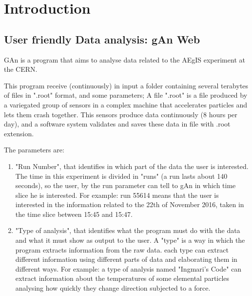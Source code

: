 
\chapter{Introduction} %

\label{Chapter1} %


\section{User friendly Data analysis: gAn Web}

GAn is a program that aims to analyse data related to the AEgIS experiment at the CERN.
 
This program receive (continuously) in input a folder containing several terabytes of files in ".root" format, and some parameters; 
A file ".root" is a file produced by a variegated group of sensors in a complex machine that accelerates particles and lets them crash together. This sensors produce data continuously (8 hours per day), and a software system validates and saves these data in file with .root extension. 

The parameters are:
\begin{enumerate}

\item "Run Number", that identifies in which part of the data the user is interested. 
The time in this experiment is divided in "runs" (a run lasts about 140 seconds), so the user, by the run parameter can tell to gAn in which time slice he is interested. For example: run 55614 means that the user is interested in the information related to the 22th of November 2016, taken in the time slice between 15:45 and 15:47.  

\item "Type of analysis", that identifies what the program must do with the data and what it must show as output to the user.
A "type" is a way in which the program extracts information from the raw data. each type can extract different information using different parts of data and elaborating them in different ways. For example: a type of analysis named "Ingmari's Code" can extract information about the temperatures of some elemental particles analysing how quickly they change direction subjected to a force. 

\end{enumerate}


